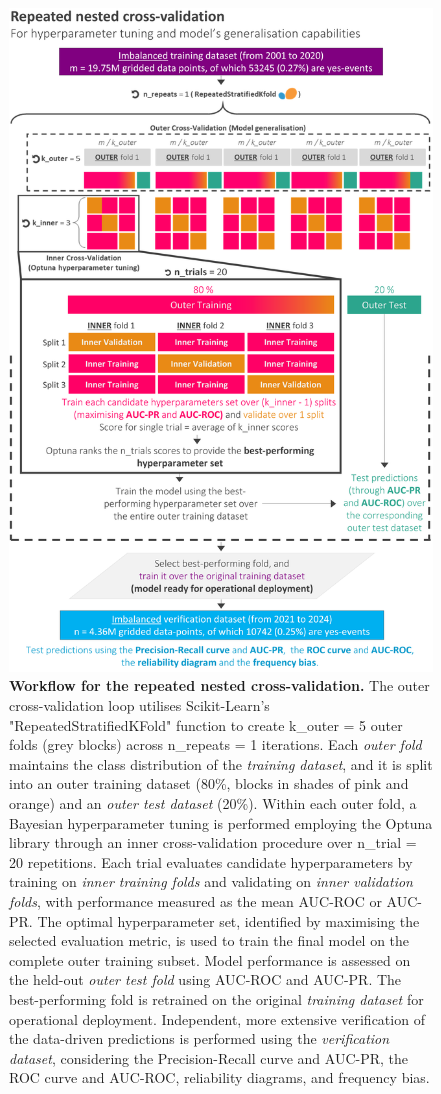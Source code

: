\documentclass[nhess, manuscript]{copernicus}
\begin{document}
\begin{figure}[t]
\includegraphics[width=12cm]{figures/cv_optuna.png}
\caption{\textbf{Workflow for the repeated nested cross-validation.} The outer cross-validation loop utilises Scikit-Learn's "RepeatedStratifiedKFold" function to create k\_outer = 5 outer folds (grey blocks) across n\_repeats = 1 iterations. Each \textit{outer fold} maintains the class distribution of the \textit{training dataset}, and it is split into an outer training dataset (80\%, blocks in shades of pink and orange) and an \textit{outer test dataset} (20\%). Within each outer fold, a Bayesian hyperparameter tuning is performed employing the Optuna library through an inner cross-validation procedure over n\_trial = 20 repetitions. Each trial evaluates candidate hyperparameters by training on \textit{inner training folds} and validating on \textit{inner validation folds}, with performance measured as the mean AUC-ROC or AUC-PR. The optimal hyperparameter set, identified by maximising the selected evaluation metric, is used to train the final model on the complete outer training subset. Model performance is assessed on the held-out \textit{outer test fold} using AUC-ROC and AUC-PR. The best-performing fold is retrained on the original \textit{training dataset} for operational deployment. Independent, more extensive verification of the data-driven predictions is performed using the \textit{verification dataset}, considering the Precision-Recall curve and AUC-PR, the ROC curve and AUC-ROC, reliability diagrams, and frequency bias.}
\label{fig:cv_optuna}
\end{figure}
\end{document}
